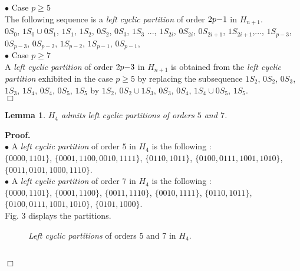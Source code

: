 \documentclass{article}
\newtheorem{lemma}{Lemma}
\begin{document}
$\bullet$ Case $p\geq 5$\\
The following sequence is a {\em left cyclic partition} of order $2p{\rm -}1$ in
$H_{n+1}$.\\
$0S_0$, $1S_0\cup 0S_1$, $1S_1$, $1S_2$, $0S_2$, $0S_3$, $1S_3$
$...$,
 $1S_{2i}$, $0S_{2i}$, $0S_{2i+1}$, $1S_{2i+1}$,..., $1S_{p-3}$, $0S_{p-3}$,
 $0S_{p-2}$, $1S_{p-2}$, $1S_{p-1}$, $0S_{p-1}$,\\ 

$\bullet$ Case $p\geq 7$\\
A {\em left cyclic partition} of order $2p{\rm -}3$ in
$H_{n+1}$ is obtained from the {\em left cyclic partition} exhibited in the
case $p\geq 5$ by replacing the subsequence 
$1S_2$, $0S_2$, $0S_3$, $1S_3$, $1S_4$, $0S_4$, $0S_5$, $1S_5$ 
by 
 $1S_2$, $0S_2\cup 1S_3$, $0S_3$, $0S_4$, $1S_4\cup 0S_5$, $1S_5$.\\
$\Box$

\begin{lemma}   \label{lem:57}
$H_4$ admits left 
cyclic partitions of orders $5$ and $7$.
\end{lemma}
{\bf Proof.}\\
$\bullet$  A {\em left cyclic partition} of order $5$ in $H_4$ is the following
:\\
$\{ 0000,1101\}$, $\{ 0001,1100,0010,1111\}$, 
$\{ 0110,1011\}$, $\{ 0100,0111,1001,1010\}$,\\ 
$\{ 0011,0101,1000,1110\}$.\\
$\bullet$ A {\em left cyclic partition} of order $7$ in $H_4$ is the following
:\\
$\{ 0000,1101\}$, $\{ 0001,1100\}$, 
$\{ 0011,1110\}$, $\{ 0010,1111\}$, 
$\{ 0110,1011\}$, \\$\{ 0100,0111,1001,1010\}$, 
$\{ 0101,1000\}$.\\
Fig. 3 displays the partitions. 
\begin{figure}[htbp]
\centering
\epsfxsize=8.6cm
\caption{\label{partgraph} {\em Left cyclic partitions} of orders $5$ and $7$ in $H_4$.}
\end{figure}\\
$\Box$
\end{document}
